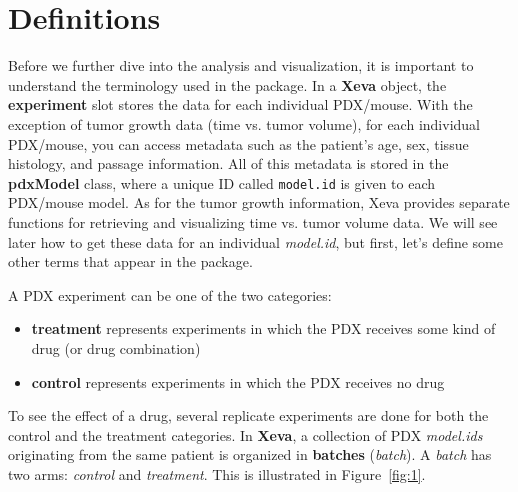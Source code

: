 \documentclass{article}\usepackage[]{graphicx}\usepackage[]{xcolor}
\begin{document}
\section{Definitions}
Before we further dive into the analysis and visualization, it is important to understand the terminology used in the  package.
In a \textbf{Xeva} object, the \textbf{experiment} slot stores the data for each individual PDX/mouse. With the exception of tumor growth data (time vs. tumor volume), for each individual PDX/mouse, you can access metadata such as the patient's age, sex, tissue histology, and passage information.
All of this metadata is stored in the \textbf{pdxModel} class, where a unique ID called \texttt{model.id} is given to each PDX/mouse model. As for the tumor growth information, Xeva provides separate functions for retrieving and visualizing time vs. tumor volume data.
We will see later how to get these data for an individual \textit{model.id}, but first, let's define some other terms that appear in the  package.

A PDX experiment can be one of the two categories:
\begin{itemize}
  \item \textbf{treatment} represents experiments in which the PDX receives some kind of drug (or drug combination)
  \item \textbf{control} represents experiments in which the PDX receives no drug
\end{itemize}

To see the effect of a drug, several replicate experiments are done for both the control and the treatment categories.
In \textbf{Xeva}, a collection of PDX \textit{model.ids} originating from the same patient is organized in \textbf{batches} (\textit{batch}). A \textit{batch} has two arms: \textit{control} and \textit{treatment}. This is illustrated in Figure~\ref{fig:1}.
\end{document}
